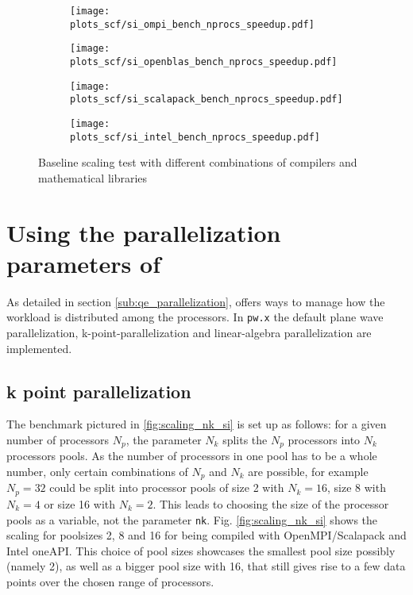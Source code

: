 \documentclass[main.tex]{subfiles}
\begin{document}
\begin{figure}[ht!]
\begin{subfigure}[b]{0.49\textwidth}
    \centering
    \texttt{[image: plots\_scf/si\_ompi\_bench\_nprocs\_speedup.pdf]}
\end{subfigure}
\begin{subfigure}[b]{0.49\textwidth}
    \centering
    \texttt{[image: plots\_scf/si\_openblas\_bench\_nprocs\_speedup.pdf]}
\end{subfigure}
\begin{subfigure}[b]{0.49\textwidth}
    \centering
    \texttt{[image: plots\_scf/si\_scalapack\_bench\_nprocs\_speedup.pdf]}
\end{subfigure}
\begin{subfigure}[b]{0.49\textwidth}
    \centering
    \texttt{[image: plots\_scf/si\_intel\_bench\_nprocs\_speedup.pdf]}
\end{subfigure}
\caption{Baseline scaling test with different combinations of compilers and mathematical libraries}
\label{fig:scaling_compilers_nprocs}
\end{figure}


\section{Using the parallelization parameters of \QE}

As detailed in section \ref{sub:qe_parallelization}, \QE offers ways to manage how the workload is distributed among the processors.
In \texttt{pw.x} the default plane wave parallelization, k-point-parallelization and linear-algebra parallelization are implemented.

\subsection{k point parallelization}

The benchmark pictured in \ref{fig:scaling_nk_si} is set up as follows: for a given number of processors \(N_p\), the parameter \(N_k\) splits the \(N_p\) processors into \(N_k\) processors pools.
As the number of processors in one pool has to be a whole number, only certain combinations of \(N_p\) and \(N_k\) are possible, for example \(N_p = 32\) could be split into processor pools of size 2 with \(N_k = 16\), size 8 with \(N_k = 4\) or size 16 with \(N_k = 2\).
This leads to choosing the size of the processor pools as a variable, not the parameter \texttt{nk}.
Fig. \ref{fig:scaling_nk_si} shows the scaling for poolsizes 2, 8 and 16 for \QE being compiled with OpenMPI/Scalapack and Intel oneAPI.
This choice of pool sizes showcases the smallest pool size possibly (namely 2), as well as a bigger pool size with 16, that still gives rise to a few data points over the chosen range of processors.
\end{document}
